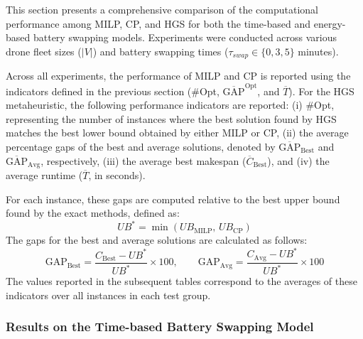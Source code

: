 \documentclass[3p, authoryear, 11pt]{elsarticle}
\begin{document}
This section presents a comprehensive comparison of the computational performance among MILP, CP, and HGS for both the time-based and energy-based battery swapping models. Experiments were conducted across various drone fleet sizes ($|V|$) and battery swapping times ($\tau_{swap} \in \{0, 3, 5\}$ minutes). 

Across all experiments, the performance of MILP and CP is reported using the indicators defined in the previous section (\#Opt, $\overline{\mathrm{GAP}}^{\mathrm{Opt}}$, and $\overline{T}$). For the HGS metaheuristic, the following performance indicators are reported:
(i) \#Opt, representing the number of instances where the best solution found by HGS matches the best lower bound obtained by either MILP or CP, 
(ii) the average percentage gaps of the best and average solutions, denoted by $\overline{\mathrm{GAP}}_{\text{Best}}$ and $\overline{\mathrm{GAP}}_{\text{Avg}}$, respectively,
(iii) the average best makespan ($\overline{C}_{\text{Best}}$), and 
(iv) the average runtime ($\overline{T}$, in seconds). 

For each instance, these gaps are computed relative to the best upper bound found by the exact methods, defined as:
\[
UB^{*} = \min(UB_{\mathrm{MILP}},\, UB_{\mathrm{CP}})
\]
The gaps for the best and average solutions are calculated as follows:
\[
\mathrm{GAP}_{\text{Best}} = \frac{C_{\text{Best}} - UB^{*}}{UB^{*}} \times 100, \qquad \mathrm{GAP}_{\text{Avg}} = \frac{C_{\text{Avg}} - UB^{*}}{UB^{*}} \times 100
\]
The values reported in the subsequent tables correspond to the averages of these indicators over all instances in each test group.
\subsubsection{Results on the Time-based Battery Swapping Model}
\label{sec:performance_time_based}
\end{document}

